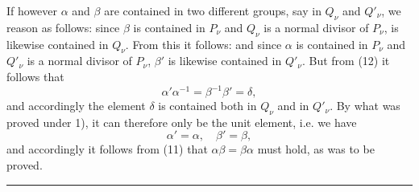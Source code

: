 If however $\alpha$ and $\beta$ are contained in two different groups, say in $Q_\nu$ and $Q'_\nu$, we reason as follows: since $\beta$ is contained in $P_\nu$ and $Q_\nu$ is a normal divisor of $P_\nu$,
is likewise contained in $Q_\nu$. From this it follows:
and since $\alpha$ is contained in $P_\nu$ and $Q'_\nu$ is a normal divisor of $P_\nu$, $\beta'$ is likewise contained in $Q'_\nu$. But from (12) it follows that
\[ \alpha'\alpha^{-1} = \beta^{-1}\beta' = \delta, \]
and accordingly the element $\delta$ is contained both in $Q_\nu$ and in $Q'_\nu$. By what was proved under 1), it can therefore only be the unit element, i.e. we have
\[ \alpha' = \alpha, \quad \beta' = \beta, \]
and accordingly it follows from (11) that $\alpha\beta = \beta\alpha$ must hold, as was to be proved.

\begin{center}
\rule{3cm}{0.4pt}
\end{center}
